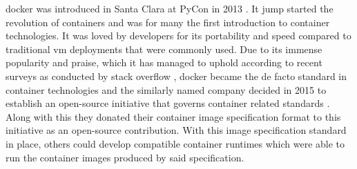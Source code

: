 \Gls{docker} was introduced in Santa Clara at PyCon in 2013 \cite{pycon2013}. It jump started the revolution of \glspl{container} and was for many the first introduction to \gls{container} technologies. It was loved by developers for its portability and speed compared to traditional \gls{vm} deployments that were commonly used. Due to its immense popularity and praise, which it has managed to uphold according to recent surveys as conducted by stack overflow \cite{stack-overflow-survey}, \gls{docker} became the de facto standard in \gls{container} technologies and the similarly named company decided in 2015 to establish an open-source initiative that governs \gls{container} related standards \cite{open-container-standard}. Along with this they donated their container image specification format \cite{open-container-standard-image-spec} to this initiative as an open-source contribution. With this image specification standard in place, others could develop compatible container runtimes which were able to run the container images produced by said specification.
